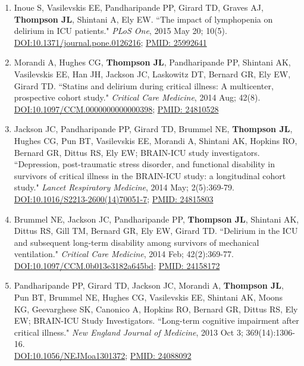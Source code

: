 \documentclass[5pt]{article}
\begin{document}
\begin{enumerate}
\item Inoue S, Vasilevskis EE, Pandharipande PP, Girard TD, Graves AJ, \textbf{Thompson JL}, Shintani A, Ely EW. ``The impact of lymphopenia on delirium in ICU patients." \emph{PLoS One}, 2015 May 20; 10(5). \href{https://doi.org/10.1371/journal.pone.0126216}{DOI:10.1371/journal.pone.0126216}; \href{https://www.ncbi.nlm.nih.gov/pubmed/25992641}{PMID: 25992641}
\item Morandi A, Hughes CG, \textbf{Thompson JL}, Pandharipande PP, Shintani AK, Vasilevskis EE, Han JH, Jackson JC, Laskowitz DT, Bernard GR, Ely EW, Girard TD. ``Statins and delirium during critical illness: A multicenter, prospective cohort study." \emph{Critical Care Medicine}, 2014 Aug; 42(8). \href{https://doi.org/10.1097/CCM.0000000000000398}{DOI:10.1097/CCM.0000000000000398}; \href{https://www.ncbi.nlm.nih.gov/pubmed/24810528}{PMID: 24810528}
\item Jackson JC, Pandharipande PP, Girard TD, Brummel NE, \textbf{Thompson JL}, Hughes CG, Pun BT, Vasilevskis EE, Morandi A, Shintani AK, Hopkins RO, Bernard GR, Dittus RS, Ely EW; BRAIN-ICU study investigators. ``Depression, post-traumatic stress disorder, and functional disability in survivors of critical illness in the BRAIN-ICU study: a longitudinal cohort study." \emph{Lancet Respiratory Medicine}, 2014 May; 2(5):369-79. \href{https://doi.org/10.1016/S2213-2600(14)70051-7}{DOI:10.1016/S2213-2600(14)70051-7}; \href{https://www.ncbi.nlm.nih.gov/pubmed/24815803}{PMID: 24815803}
\item Brummel NE, Jackson JC, Pandharipande PP, \textbf{Thompson JL}, Shintani AK, Dittus RS, Gill TM, Bernard GR, Ely EW, Girard TD. ``Delirium in the ICU and subsequent long-term disability among survivors of mechanical ventilation." \emph{Critical Care Medicine}, 2014 Feb; 42(2):369-77.\\ \href{https://doi.org/10.1097/CCM.0b013e3182a645bd}{DOI:10.1097/CCM.0b013e3182a645bd}; \href{https://www.ncbi.nlm.nih.gov/pubmed/24158172}{PMID: 24158172}
\item Pandharipande PP, Girard TD, Jackson JC, Morandi A, \textbf{Thompson JL}, Pun BT, Brummel NE, Hughes CG, Vasilevskis EE, Shintani AK, Moons KG, Geevarghese SK, Canonico A, Hopkins RO, Bernard GR, Dittus RS, Ely EW; BRAIN-ICU Study Investigators. ``Long-term cognitive impairment after critical illness." \emph{New England Journal of Medicine}, 2013 Oct 3; 369(14):1306-16.\\ \href{https://doi.org/10.1056/NEJMoa1301372}{DOI:10.1056/NEJMoa1301372}; \href{https://www.ncbi.nlm.nih.gov/pubmed/24088092}{PMID: 24088092}

\end{enumerate}
\end{document}
